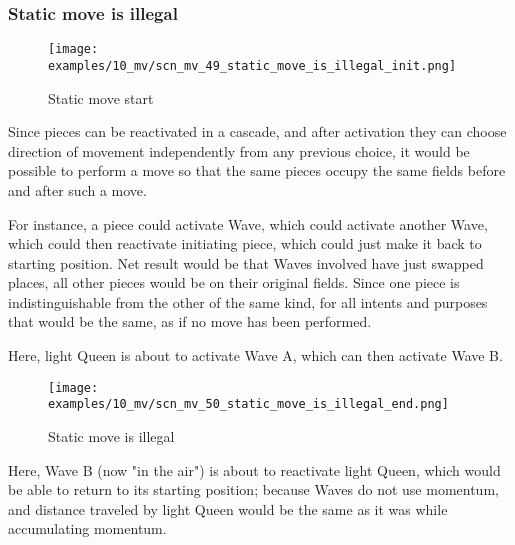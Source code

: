 \subsubsection*{Static move is illegal}
\label{sec:Miranda's veil/Wave/Cascading Waves/Static move is illegal}

\vspace*{-1.4\baselineskip}
\noindent
\begin{figure}[!h]
\texttt{[image: examples/10\_mv/scn\_mv\_49\_static\_move\_is\_illegal\_init.png]}
\vspace*{-1.3\baselineskip}
\caption{Static move start}
\label{fig:scn_mv_49_static_move_is_illegal_init}
\end{figure}

\vspace*{-0.4\baselineskip}
Since pieces can be reactivated in a cascade, and after activation they can choose
direction of movement independently from any previous choice, it would be possible
to perform a move so that the same pieces occupy the same fields before and after
such a move.

For instance, a piece could activate Wave, which could activate another Wave, which
could then reactivate initiating piece, which could just make it back to starting
position. Net result would be that Waves involved have just swapped places, all other
pieces would be on their original fields. Since one piece is indistinguishable from
the other of the same kind, for all intents and purposes that would be the same, as
if no move has been performed.

Here, light Queen is about to activate Wave A, which can then activate Wave B.

\clearpage %

\vspace*{-2.1\baselineskip}
\noindent
\begin{figure}[!h]
\texttt{[image: examples/10\_mv/scn\_mv\_50\_static\_move\_is\_illegal\_end.png]}
\vspace*{-1.3\baselineskip}
\caption{Static move is illegal}
\label{fig:scn_mv_50_static_move_is_illegal_end}
\end{figure}

\vspace*{-0.4\baselineskip}
Here, Wave B (now "in the air") is about to reactivate light Queen, which would be
able to return to its starting position; because Waves do not use momentum, and
distance traveled by light Queen would be the same as it was while accumulating
momentum.

